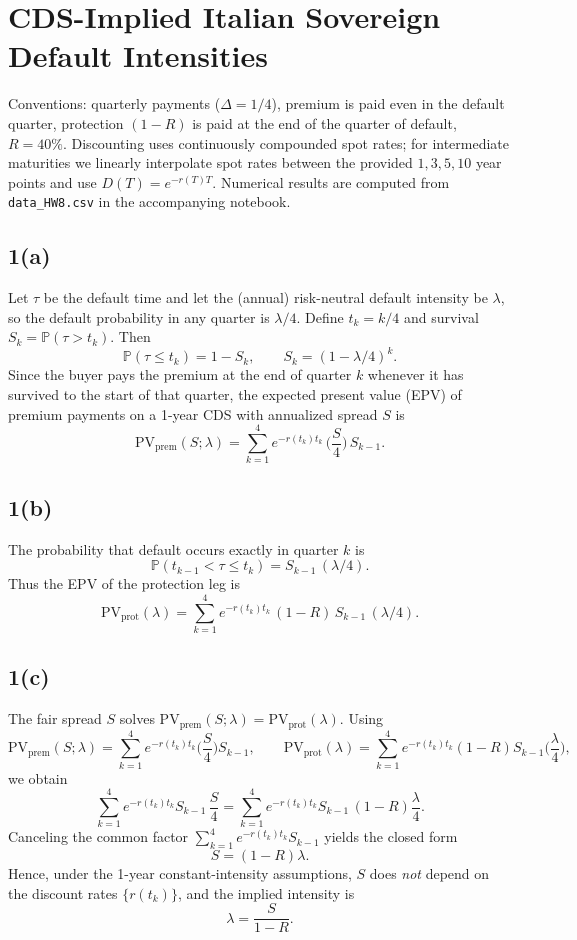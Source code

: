 \section{CDS-Implied Italian Sovereign Default Intensities}
Conventions: quarterly payments ($\Delta=1/4$), premium is paid even in the default quarter, protection $(1-R)$ is paid at the end of the quarter of default, $R=40\%$. Discounting uses continuously compounded spot rates; for intermediate maturities we linearly interpolate spot rates between the provided $1,3,5,10$ year points and use $D(T)=e^{-r(T)T}$. Numerical results are computed from \texttt{data\_HW8.csv} in the accompanying notebook.
\subsection*{1(a)}
Let $\tau$ be the default time and let the (annual) risk-neutral default intensity be $\lambda$, so the default probability in any quarter is $\lambda/4$. Define $t_k=k/4$ and survival $S_k=\mathbb{P}(\tau>t_k)$. Then
\[
\mathbb{P}(\tau\le t_k)=1-S_k,\qquad S_k=(1-\lambda/4)^k.
\]
Since the buyer pays the premium at the end of quarter $k$ whenever it has survived to the start of that quarter, the expected present value (EPV) of premium payments on a 1-year CDS with annualized spread $S$ is
\[
\mathrm{PV}_{\text{prem}}(S;\lambda)=\sum_{k=1}^{4} e^{-r(t_k)t_k}\,\Big(\frac{S}{4}\Big)\,S_{k-1}.
\]
\subsection*{1(b)}
The probability that default occurs exactly in quarter $k$ is
\[
\mathbb{P}(t_{k-1}<\tau\le t_k)=S_{k-1}\,(\lambda/4).
\]
Thus the EPV of the protection leg is
\[
\mathrm{PV}_{\text{prot}}(\lambda)=\sum_{k=1}^{4} e^{-r(t_k)t_k}\,(1-R)\,S_{k-1}\,(\lambda/4).
\]
\subsection*{1(c)}
The fair spread $S$ solves $\mathrm{PV}_{\text{prem}}(S;\lambda)=\mathrm{PV}_{\text{prot}}(\lambda)$. Using
\[
\mathrm{PV}_{\text{prem}}(S;\lambda)=\sum_{k=1}^{4} e^{-r(t_k)t_k}\Big(\frac{S}{4}\Big)S_{k-1},
\qquad
\mathrm{PV}_{\text{prot}}(\lambda)=\sum_{k=1}^{4} e^{-r(t_k)t_k}(1-R)S_{k-1}\Big(\frac{\lambda}{4}\Big),
\]
we obtain
\[
\sum_{k=1}^{4} e^{-r(t_k)t_k}S_{k-1}\,\frac{S}{4}
=
\sum_{k=1}^{4} e^{-r(t_k)t_k}S_{k-1}\,(1-R)\frac{\lambda}{4}.
\]
Canceling the common factor $\sum_{k=1}^{4} e^{-r(t_k)t_k}S_{k-1}$ yields the closed form
\[
S=(1-R)\lambda.
\]
Hence, under the 1-year constant-intensity assumptions, $S$ does \emph{not} depend on the discount rates $\{r(t_k)\}$, and the implied intensity is
\[
\lambda=\frac{S}{1-R}.
\]
